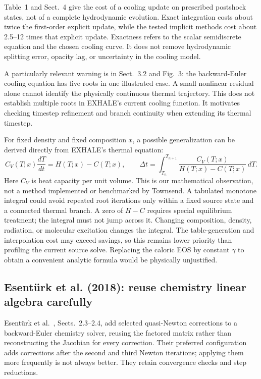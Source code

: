 \documentclass[english,a4paper]{my_memo}
\begin{document}
Table~1 and Sect.~4 give the cost of a cooling update on prescribed postshock states, not of a complete hydrodynamic evolution. Exact integration costs about twice the first-order explicit update, while the tested implicit methods cost about 2.5--12 times that explicit update. Exactness refers to the scalar semidiscrete equation and the chosen cooling curve. It does not remove hydrodynamic splitting error, opacity lag, or uncertainty in the cooling model.

A particularly relevant warning is in Sect.~3.2 and Fig.~3: the backward-Euler cooling equation has five roots in one illustrated case. A small nonlinear residual alone cannot identify the physically continuous thermal trajectory. This does not establish multiple roots in EXHALE's current cooling function. It motivates checking timestep refinement and branch continuity when extending its thermal timestep.

For fixed density and fixed composition $x$, a possible generalization can be derived directly from EXHALE's thermal equation:
\begin{equation}
 C_V(T;x)\frac{dT}{dt}=H(T;x)-C(T;x),\qquad
 \Delta t=\int_{T_n}^{T_{n+1}}
 \frac{C_V(T;x)}{H(T;x)-C(T;x)}\,dT.
\end{equation}
Here $C_V$ is heat capacity per unit volume. This is our mathematical observation, not a method implemented or benchmarked by Townsend. A tabulated monotone integral could avoid repeated root iterations only within a fixed source state and a connected thermal branch. A zero of $H-C$ requires special equilibrium treatment; the integral must not jump across it. Changing composition, density, radiation, or molecular excitation changes the integral. The table-generation and interpolation cost may exceed savings, so this remains lower priority than profiling the current source solve. Replacing the caloric EOS by constant $\gamma$ to obtain a convenient analytic formula would be physically unjustified.

\subsection{Esent\"urk et al. (2018): reuse chemistry linear algebra carefully}
Esent\"urk et al.\ \cite{esenturk}, Sects.~2.3--2.4, add selected quasi-Newton corrections to a backward-Euler chemistry solver, reusing the factored matrix rather than reconstructing the Jacobian for every correction. Their preferred configuration adds corrections after the second and third Newton iterations; applying them more frequently is not always better. They retain convergence checks and step reductions.
\end{document}
